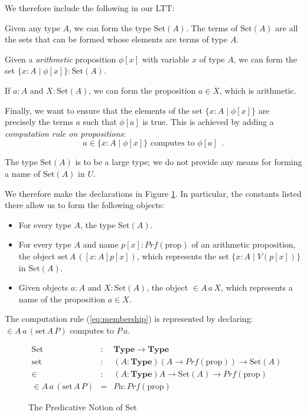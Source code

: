 \documentclass[acmtocl]{acmtrans2m}
\newcommand{\Type}{\mathbf{Type}}
\newcommand{\Prf}[1]{Prf \left( {#1} \right)}
\newcommand{\Set}[1]{\mathrm{Set} \left( {#1} \right)}
\newcommand{\p}{\mathrm{prop}}
\newcommand{\set}{\mathrm{set}}
\begin{document}
\pagebreak

We therefore include the following in our LTT:
\begin{longitem}
\item
Given any type $A$, we can form the type $\Set{A}$.  The terms of $\Set{A}$ are all the sets that can be formed whose elements are terms of type $A$.
\item
Given a \emph{arithmetic} proposition $\phi[x]$ with variable $x$ of type $A$, we can form the set $\{ x : A \mid \phi[x] \} : \Set{A}$.
\item
If $a : A$ and $X : \Set{A}$, we can form the proposition $a \in X$, which is arithmetic.
\item
Finally, we want to ensure that the elements of the set $\{ x : A \mid \phi[x] \}$ are precisely the terms $a$ such that $\phi[a]$ is true.  This is achieved by adding a \emph{computation rule on propositions}:
\begin{equation}
 \label{eq:membership}
a \in \{ x : A \mid \phi[x] \} \mbox{ computes to } \phi[a] \enspace .
\end{equation}
\end{longitem}
The type $\Set{A}$ is to be a large type; we do not provide any means for forming a name of $\Set{A}$ in $U$.

We therefore make the declarations in Figure \ref{fig:sets}.
In particular, the constants listed there allow us to form the following objects:
\begin{itemize}
 \item For every type $A$, the type $\Set{A}$.
\item For every type $A$ and name $p[x] : \Prf{\p}$ of an arithmetic proposition, the object $\set \, A \, ([x:A]p[x])$, which represents the set $\{ x : A \mid V(p[x]) \}$ in $\Set{A}$.
\item Given objects $a : A$ and $X : \Set{A}$, the object $\in A \, a \, X$, which represents a name of the proposition $a \in X$.
\end{itemize}
The computation rule (\ref{eq:membership}) is represented by declaring: $\in A \, a \, (\set \, A \, P)$ computes to $P\, a$.

\begin{figure}[top]
\begin{eqnarray*}
\mathrm{Set} & : & \Type \rightarrow \Type \\
\set & : & (A : \Type) (A \rightarrow \Prf{\p}) \rightarrow \Set{A} \\
\in & : & (A : \Type) A \rightarrow \Set{A} \rightarrow \Prf{\p} \\
\in \! A \, a \, (\set \, A \, P) & = & P a : \Prf{\p}
\end{eqnarray*}
\caption{The Predicative Notion of Set}
\label{fig:sets}
\end{figure}
\end{document}
